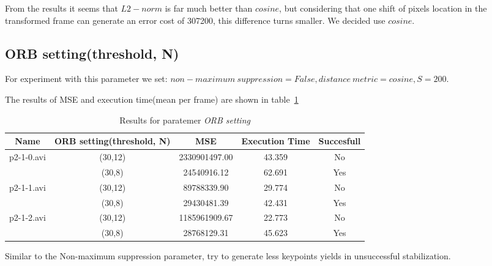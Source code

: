 From the results it seems that $L2-norm$ is far much better than $cosine$, but considering that one shift of pixels location in the transformed frame can generate an error cost of 307200, this difference turns smaller. We decided use $cosine$.

\subsection{ORB setting(threshold, N)}

For experiment with this parameter we set: $non-maximum~suppression=False, distance~metric=cosine, S = 200$.

The results of MSE and execution time(mean per frame) are shown in table~\ref{table:comparison-ORB}

\begin{table}[H]
\centering
\begin{tabular}{|c|c|c|c|c|}
\hline
\textbf{Name} & \textbf{ORB setting(threshold, N)} & \textbf{MSE} & \textbf{Execution Time} & \textbf{Succesfull} \\ \hline
\multirow{2}{*}{p2-1-0.avi} & (30,12) & 2330901497.00 & 43.359 & No \\ \cline{2-5} 
 & (30,8) & 24540916.12 & 62.691 & Yes \\ \hline
\multirow{2}{*}{p2-1-1.avi} & (30,12) & 89788339.90 & 29.774 & No \\ \cline{2-5} 
 & (30,8) & 29430481.39 & 42.431 & Yes \\ \hline
\multirow{2}{*}{p2-1-2.avi} & (30,12) & 1185961909.67 & 22.773 & No \\ \cline{2-5} 
 & (30,8) & 28768129.31 & 45.623 & Yes \\ \hline
\end{tabular}
\caption{Results for paratemer \textit{ORB setting}}
\label{table:comparison-ORB}
\end{table}

Similar to the Non-maximum suppression parameter, try to generate less keypoints yields in unsuccessful stabilization.

